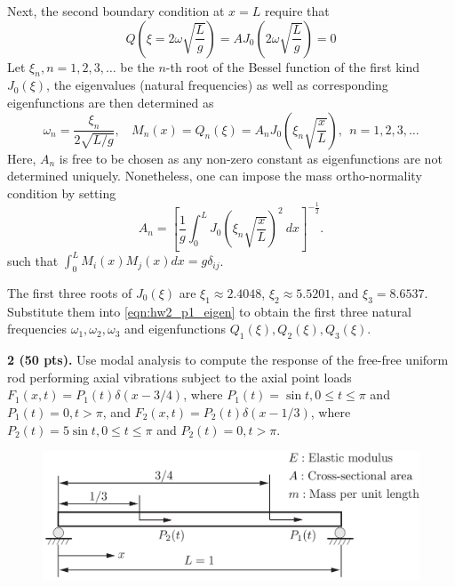 \begin{enumerate}[(i)]
{\begin{enumerate}[(1)]
{    Next, the second boundary condition at $x = L$ require that 
    \begin{equation}
        Q\left(\xi = 2\omega \sqrt{\frac{L}{g}}\right) = A J_0\left(2\omega \sqrt{\frac{L}{g}}\right) = 0
    \end{equation}
    Let $\xi_n, n = 1, 2, 3, \ldots$ be the $n$-th root of the Bessel function of the first kind $J_0(\xi)$, the eigenvalues (natural frequencies) as well as corresponding eigenfunctions are then determined as 
    \begin{equation}\label{eqn:hw2_p1_eigen}
        \boxed{\omega_n = \frac{\xi_n}{2\sqrt{L/g}}, ~~~~ M_n(x) = Q_n(\xi) = A_n J_0\left(\xi_n \sqrt{\frac{x}{L}}\right), ~~ n = 1, 2, 3, \ldots}
    \end{equation}
    Here, $A_n$ is free to be chosen as any non-zero constant as eigenfunctions are not determined uniquely.
    Nonetheless, one can impose the mass ortho-normality condition by setting 
    \begin{equation}
        A_n = {\left[\frac{1}{g}\int_0^L {J_0\left(\xi_n \sqrt{\frac{x}{L}}\right)}^2 ~dx\right]}^{-\frac{1}{2}}.
    \end{equation}
    such that $\int_0^L M_i(x)M_j(x) dx = g\delta_{ij}$.

    The first three roots of $J_0(\xi)$ are $\xi_1 \approx 2.4048$, $\xi_2 \approx 5.5201$, and $\xi_3 = 8.6537$.
    Substitute them into \cref{eqn:hw2_p1_eigen} to obtain the first three natural frequencies $\omega_1, \omega_2, \omega_3$ and eigenfunctions $Q_1(\xi), Q_2(\xi), Q_3(\xi)$.
}
\end{enumerate}
}
\end{enumerate}

\begin{problem}
\textbf{2 (50 pts).} Use modal analysis to compute the response of the free-free uniform rod performing axial vibrations subject to the axial point loads $F_1(x, t) = P_1(t)\delta(x - 3/4)$, where $P_1(t) = \sin t, 0 \leq t \leq \pi$ and $P_1(t) = 0, t > \pi$, and $F_2(x, t) = P_2(t)\delta(x - 1/3)$, where $P_2(t) = 5\sin t, 0 \leq t \leq \pi$ and $P_2(t) = 0, t > \pi$.
\end{problem}
\begin{figure}[!ht]
    \centering
    \includegraphics[width=0.7\linewidth]{homework/hw2/assets/hw2_p2.pdf}
\end{figure}

